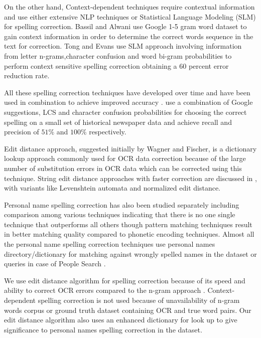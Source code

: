 \documentclass[12pt]{article}
\begin{document}
On the other hand, Context-dependent techniques require contextual information and use either extensive NLP techniques or Statistical Language Modeling (SLM) for spelling correction.
Bassil and Alwani\cite{bassil2012ocr} use Google 1-5 gram word dataset to gain context information in order to determine the correct words sequence in the text for correction.
Tong and Evans\cite{tong1996statistical} use SLM approach involving information from letter n-grams,character confusion and word bi-gram probabilities to perform context sensitive spelling correction obtaining a 60 percent error reduction rate. 

All these spelling correction techniques have developed over time and have been used in combination to achieve improved accuracy \cite{brill2000improved}. \cite{agarwal2013utilizing} use a combination of Google suggestions, LCS and character confusion probabilities for choosing the correct spelling on a small set of historical newspaper data and achieve recall and precision of $51\%$ and $100\%$ respectively.


Edit distance approach, suggested initially by Wagner and Fischer\cite{wagner1974string}, is a dictionary lookup approach commonly used for OCR data correction because of the large number of substitution errors in OCR data  \cite{kukich1992techniques}\cite{christen2006comparison} which can be corrected using this technique. String edit distance approaches with faster correction are discussed in \cite{marzal1993computation},\cite{schulz2002fast}  with variants like Levenshtein automata and normalized edit distance.

Personal name spelling correction has also been studied separately including comparison among various techniques indicating that there is no one single technique that outperforms all others though pattern matching techniques result in better matching quality compared to phonetic encoding techniques\cite{christen2006comparison}. Almost all the personal name spelling correction techniques use personal names directory/dictionary for matching against wrongly spelled names in the dataset or queries in case of People Search \cite{udupa2010hashing}. 
  
 We use edit distance algorithm for spelling correction because of its speed and ability to correct OCR errors compared to the n-gram approach \cite{chattopadhyaya2013fast}. Context-dependent spelling correction is not used because of unavailability of n-gram words corpus or ground truth dataset containing OCR and true word pairs. Our edit distance algorithm also uses an enhanced dictionary for look up to give significance to personal names spelling correction in the dataset. 
\end{document}

